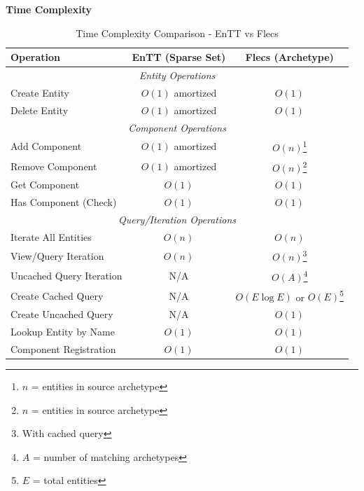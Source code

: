 \documentclass[]{final_report}
\begin{document}
\textbf{Time Complexity} \newline
\begin{table}[!h]
	\centering
	\begin{tabular}{|l|c|c|}
		\hline
		\textbf{Operation} & \textbf{EnTT (Sparse Set)} & \textbf{Flecs (Archetype)} \\
		\hline
		\multicolumn{3}{|c|}{\textit{Entity Operations}} \\
		\hline
		Create Entity & $O(1)$ amortized & $O(1)$ \\
		\hline
		Delete Entity & $O(1)$ amortized & $O(1)$ \\
		\hline
		\multicolumn{3}{|c|}{\textit{Component Operations}} \\
		\hline
		Add Component & $O(1)$ amortized & $O(n)$\footnote{$n$ = entities in source archetype} \\
		\hline
		Remove Component & $O(1)$ amortized & $O(n)$\footnote{$n$ = entities in source archetype} \\
		\hline
		Get Component & $O(1)$ & $O(1)$ \\
		\hline
		Has Component (Check) & $O(1)$ & $O(1)$ \\
		\hline
		\multicolumn{3}{|c|}{\textit{Query/Iteration Operations}} \\
		\hline
		Iterate All Entities & $O(n)$ & $O(n)$ \\
		\hline
		View/Query Iteration & $O(n)$ & $O(n)$\footnote{With cached query} \\
		\hline
		Uncached Query Iteration & N/A & $O(A)$\footnote{$A$ = number of matching archetypes} \\
		\hline
		Create Cached Query & N/A & $O(E \log E)$ or $O(E)$\footnote{$E$ = total entities} \\
		\hline
		Create Uncached Query & N/A & $O(1)$ \\
		\hline
		Lookup Entity by Name & $O(1)$ & $O(1)$ \\
		\hline
		Component Registration & $O(1)$ & $O(1)$ \\
		\hline
	\end{tabular}
	\caption{Time Complexity Comparison - EnTT vs Flecs}
\end{table}
\end{document}
